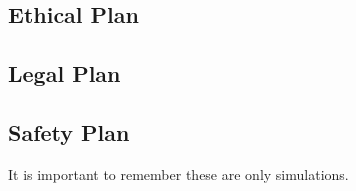 \subsection{Ethical Plan}
\subsection{Legal Plan}
\subsection{Safety Plan}
It is important to remember these are only simulations. 